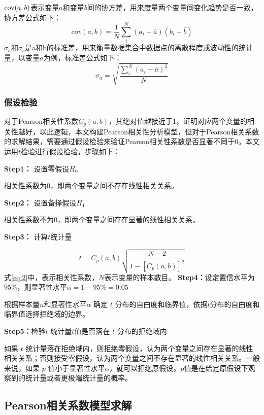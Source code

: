 \documentclass[withoutpreface,bwprint]{cumcmthesis}
\begin{document}
	${\mathop{\rm cov}} (a,b)$表示变量$a$和变量$b$间的协方差，用来度量两个变量间变化趋势是否一致，协方差公式如下：
\begin{equation}
\label{eq:4}
	cov(a,b)=\frac{1}{N}\sum_{i}^{N}{({{a}_{i}}-\bar{a})({{b}_{i}}-\bar{b})}
\end{equation}
${{\sigma }_{a}}$和${{\sigma }_{b}}$是a和b的标准差，用来衡量数据集合中数据点的离散程度或波动性的统计量，以变量$a$为例，标准差公式如下：
\begin{equation}
	{{\sigma }_{a}}=\sqrt{\frac{\sum_{i}^{N}{{{({{a}_{i}}-\bar{a})}^{2}}}}{N}}
\end{equation}
\subsubsection{假设检验}
对于Pearson相关性系数${{C}_{p}}(a,b)$，其绝对值越接近于1，证明对应两个变量的相关性越好，以此逻辑，本文构建Pearson相关性分析模型，但对于Pearson相关系数的求解结果，需要通过假设检验来验证Pearson相关性系数是否显著不同于0。本文运用$t$检验进行假设检验，步骤如下：

	\textbf{Step1：} 设置零假设$H_{0}$ 
	
	相关性系数为0，即两个变量之间不存在线性相关关系。
	
	\textbf{Step2：} 设置备择假设$H_{1}$ 
	
	相关性系数不为0，即两个变量之间存在显著的线性相关关系。
	
	\textbf{Step3：} 计算$t$统计量
	
	\begin{equation}
		\label{eq:2}
		t={{C}_{p}}(a,b)\sqrt{\frac{N-2}{1-{{\left [{{{C}_{p}}(a,b)}\right ]}^{2}}}}
	\end{equation}
	式\eqref{eq:2}中，表示相关性系数，$N$表示变量的样本数目。
	\textbf{Step4：}设定置信水平为$95\%$，则显著性水平$\alpha =1-95\%=0.05$
	
	根据样本量$n$和显著性水平$\alpha $ 确定 $t$ 分布的自由度和临界值，依据$t$分布的自由度和临界值选择拒绝域的边界。
	
	\textbf{Step5：}检验$t$ 统计量$t$值是否落在 $t$ 分布的拒绝域内
	
	如果 $t$ 统计量落在拒绝域内，则拒绝零假设，认为两个变量之间存在显著的线性相关关系；否则接受零假设，认为两个变量之间不存在显著的线性相关关系。一般来说，如果 $p$ 值小于显著性水平$\alpha $，就可以拒绝原假设。$p$值是在给定原假设下观察到的统计量或者更极端统计量的概率。
	
	\subsection{Pearson相关系数模型求解}
\end{document}
